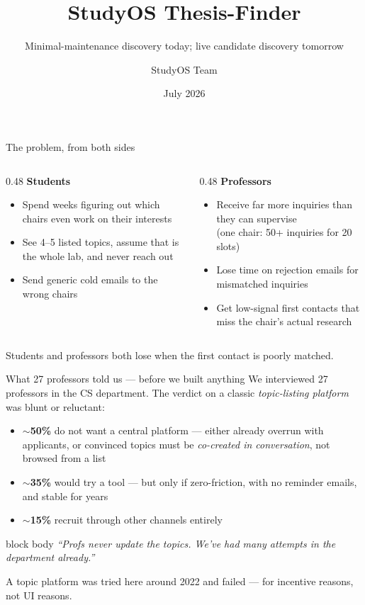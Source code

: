 \documentclass[11pt,aspectratio=169]{beamer}
\title{StudyOS Thesis-Finder}
\subtitle{Minimal-maintenance discovery today; live candidate discovery tomorrow}
\author{StudyOS Team}
\institute{Department of Computer Science, University of Tübingen}
\date{July 2026}
\newcommand{\quotebox}[1]{%
  \begin{beamercolorbox}[rounded=true,sep=0.6em]{block body}%
    \itshape #1%
  \end{beamercolorbox}}
\begin{document}
\maketitle

\begin{frame}{The problem, from both sides}
  \begin{columns}[T]
    \begin{column}{0.48\textwidth}
      \textbf{Students}
      \begin{itemize}
        \item Spend weeks figuring out which chairs even work on their interests
        \item See 4--5 listed topics, assume that is the whole lab, and never reach out
        \item Send generic cold emails to the wrong chairs
      \end{itemize}
    \end{column}
    \begin{column}{0.48\textwidth}
      \textbf{Professors}
      \begin{itemize}
        \item Receive far more inquiries than they can supervise \\ (one chair: 50+ inquiries for 20 slots)
        \item Lose time on rejection emails for mismatched inquiries
        \item Get low-signal first contacts that miss the chair's actual research
      \end{itemize}
    \end{column}
  \end{columns}
  \vspace{1em}
  \begin{center}
    \alert{Students and professors both lose when the first contact is poorly matched.}
  \end{center}
\end{frame}

\begin{frame}{What 27 professors told us --- before we built anything}
  We interviewed 27 professors in the CS department. The verdict on a classic
  \emph{topic-listing platform} was blunt or reluctant:
  \begin{itemize}
    \item \textbf{$\sim$50\%} do not want a central platform --- either already
      overrun with applicants, or convinced topics must be
      \emph{co-created in conversation}, not browsed from a list
    \item \textbf{$\sim$35\%} would try a tool --- but only if zero-friction,
      with no reminder emails, and stable for years
    \item \textbf{$\sim$15\%} recruit through other channels entirely
  \end{itemize}
  \quotebox{``Profs never update the topics. We've had many attempts in the
  department already.''}

  A topic platform was tried here around 2022 and failed --- for
  \alert{incentive} reasons, not UI reasons.
\end{frame}
\end{document}
